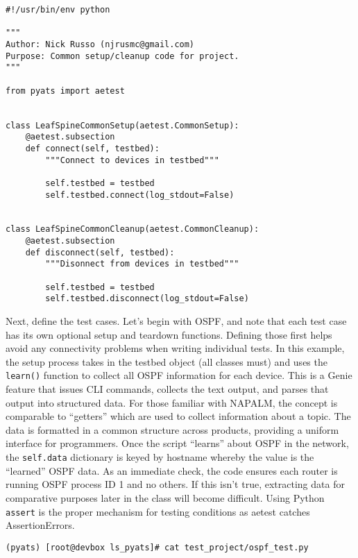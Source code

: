 \begin{verbatim}
#!/usr/bin/env python

"""
Author: Nick Russo (njrusmc@gmail.com)
Purpose: Common setup/cleanup code for project.
"""

from pyats import aetest


class LeafSpineCommonSetup(aetest.CommonSetup):
    @aetest.subsection
    def connect(self, testbed):
        """Connect to devices in testbed"""

        self.testbed = testbed
        self.testbed.connect(log_stdout=False)


class LeafSpineCommonCleanup(aetest.CommonCleanup):
    @aetest.subsection
    def disconnect(self, testbed):
        """Disonnect from devices in testbed"""

        self.testbed = testbed
        self.testbed.disconnect(log_stdout=False)
\end{verbatim}

Next, define the test cases. Let's begin with OSPF, and note that each test
case has its own optional setup and teardown functions. Defining those first
helps avoid any connectivity problems when writing individual tests. In this
example, the setup process takes in the testbed object (all classes must) and
uses the \verb|learn()| function to collect all OSPF information for each
device. This is a Genie feature that issues CLI commands, collects the text
output, and parses that output into structured data. For those familiar with
NAPALM, the concept is comparable to ``getters'' which are used to collect
information about a topic. The data is formatted in a common structure
across products, providing a uniform interface for programmers.
Once the script ``learns'' about OSPF in the network, the \verb|self.data|
dictionary is keyed by hostname whereby the value is the ``learned'' OSPF data.
As an immediate check, the code ensures each router is running OSPF process ID
1 and no others. If this isn't true, extracting data for comparative purposes
later in the class will become difficult. Using Python \verb|assert| is the
proper mechanism for testing conditions as aetest catches AssertionErrors.


\begin{verbatim}
(pyats) [root@devbox ls_pyats]# cat test_project/ospf_test.py
\end{verbatim}

